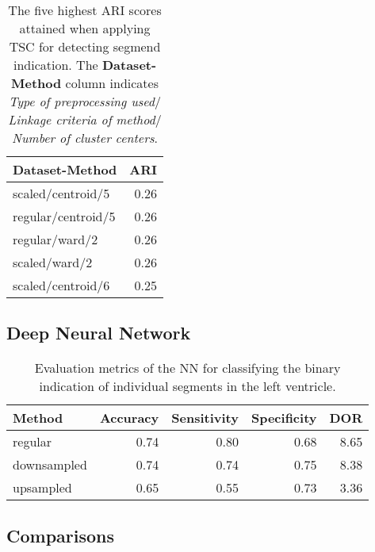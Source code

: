 \begin{table*}
    \centering
    \begin{tabular}{lr}
        \toprule
        Dataset-Method     &  ARI \\
        \midrule
        scaled/centroid/5  & 0.26 \\
        regular/centroid/5 & 0.26 \\
        regular/ward/2     & 0.26 \\
        scaled/ward/2      & 0.26 \\
        scaled/centroid/6  & 0.25 \\
        \bottomrule
    \end{tabular}
    \caption{The five highest ARI scores attained when applying TSC for detecting segmend indication.
             The \textbf{Dataset-Method} column indicates \textit{Type of preprocessing used}$/$\textit{Linkage criteria of method}$/$\textit{Number of cluster centers}.}
    \label{tab:pvc_ind_ari}
\end{table*}

\newpage

\subsection{Deep Neural Network}

\begin{table*}[htb]
    \centering
    \begin{tabular}{lrrrr}
        \toprule
        Method      &  Accuracy &  Sensitivity &  Specificity &  DOR \\
        \midrule
        regular     &      0.74 &         0.80 &         0.68 & 8.65 \\
        downsampled &      0.74 &         0.74 &         0.75 & 8.38 \\
        upsampled   &      0.65 &         0.55 &         0.73 & 3.36 \\
        \bottomrule
    \end{tabular}
    \caption{Evaluation metrics of the NN for classifying the binary indication of individual segments in the left ventricle.}
    \label{tab:NN_segm_ind_perf}
\end{table*}

\begin{comment}
    [ ] 
\end{comment}

\subsection{Comparisons}

\begin{comment}
    [ ] 
\end{comment}

